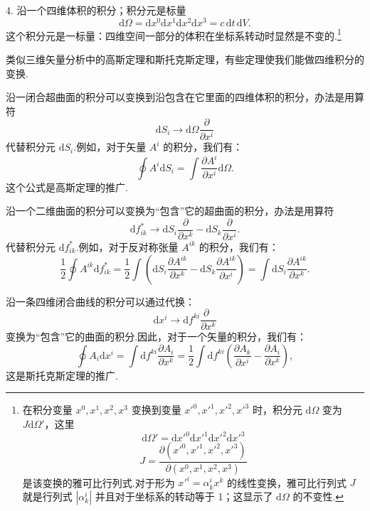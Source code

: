 4. 沿一个四维体积的积分；积分元是标量
\begin{equation}
  \mathrm{d}\Omega=\mathrm{d}x^0\mathrm{d}x^1\mathrm{d}x^2\mathrm{d}x^3=c\,\mathrm{d}t\,\mathrm{d}V.
\end{equation}
这个积分元是一标量：四维空间一部分的体积在坐标系转动时显然是不变的.\footnote{在积分变量 $x^0,x^1,x^2,x^3$ 变换到变量 $x'^0,x'^1,x'^2,x'^3$ 时，积分元 $\mathrm{d}\Omega$ 变为 $J\mathrm{d}\Omega'$，这里
\begin{equation*}
  \mathrm{d}\Omega'=\mathrm{d}x'^0\mathrm{d}x'^1\mathrm{d}x'^2\mathrm{d}x'^3
\end{equation*}
\begin{equation*}
  J=\frac{\partial(x'^0,x'^1,x'^2,x'^3)}{\partial(x^0,x^1,x^2,x^3)}
\end{equation*}
是该变换的雅可比行列式.对于形为 $x'^i=\alpha^i_k x^k$ 的线性变换，雅可比行列式 $J$ 就是行列式 $|\alpha^i_k|$ 并且对于坐标系的转动等于 1；这显示了 $\mathrm{d}\Omega$ 的不变性.}

类似三维矢量分析中的高斯定理和斯托克斯定理，有些定理使我们能做四维积分的变换.

沿一闭合超曲面的积分可以变换到沿包含在它里面的四维体积的积分，办法是用算符
\begin{equation}
  \mathrm{d}S_i\to\mathrm{d}\Omega\frac{\partial}{\partial x^i}
\end{equation}
代替积分元 $\mathrm{d}S_i$.例如，对于矢量 $A^i$ 的积分，我们有：
\begin{equation}
  \oint A^i\mathrm{d}S_i=\int\frac{\partial A^i}{\partial x^i}\mathrm{d}\Omega.
\end{equation}
这个公式是高斯定理的推广.

沿一个二维曲面的积分可以变换为“包含”它的超曲面的积分，办法是用算符
\begin{equation}
  \mathrm{d}f^{*}_{ik}\to\mathrm{d}S_i\frac{\partial}{\partial x^k}
  -\mathrm{d}S_k\frac{\partial}{\partial x^i}.
\end{equation}
代替积分元 $\mathrm{d}f^{*}_{ik}$.例如，对于反对称张量 $A^{ik}$ 的积分，我们有：
\begin{equation}
  \frac{1}{2}\oint A^{ik}\mathrm{d}f^{*}_{ik}
  =\frac{1}{2}\int\left(\mathrm{d}S_i\frac{\partial A^{ik}}{\partial x^k}
  -\mathrm{d}S_k\frac{\partial A^{ik}}{\partial x^i}\right)
  =\int\mathrm{d}S_i\frac{\partial A^{ik}}{\partial x^k}.
\end{equation}

沿一条四维闭合曲线的积分可以通过代换：
\begin{equation}
  \mathrm{d}x^i\to\mathrm{d}f^{ki}\frac{\partial\ \ }{\partial x^k}
\end{equation}
变换为“包含”它的曲面的积分.因此，对于一个矢量的积分，我们有：
\begin{equation}
  \oint A_i\mathrm{d}x^i
  =\int\mathrm{d}f^{ki}\frac{\partial A_i}{\partial x^k}
  =\frac{1}{2}\int\mathrm{d}f^{ki}
  \left(\frac{\partial A_k}{\partial x^i}-\frac{\partial A_i}{\partial x^k}\right),
\end{equation}
这是斯托克斯定理的推广.

